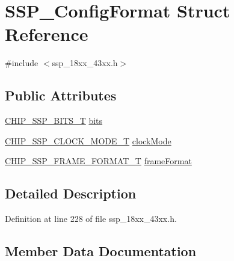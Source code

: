 \hypertarget{struct_s_s_p___config_format}{}\section{S\+S\+P\+\_\+\+Config\+Format Struct Reference}
\label{struct_s_s_p___config_format}


{\ttfamily \#include $<$ssp\+\_\+18xx\+\_\+43xx.\+h$>$}

\subsection*{Public Attributes}
\begin{DoxyCompactItemize}
\item 
\hyperlink{group___s_s_p__18_x_x__43_x_x_ga4e348748c4fb42ef94c2cbd968a43648}{C\+H\+I\+P\+\_\+\+S\+S\+P\+\_\+\+B\+I\+T\+S\+\_\+T} \hyperlink{struct_s_s_p___config_format_afaeb54b5e0525adda38644d3ef84dca1}{bits}
\item 
\hyperlink{group___s_s_p__18_x_x__43_x_x_ga12dec81e345a9ffbefd6a1fae5759e09}{C\+H\+I\+P\+\_\+\+S\+S\+P\+\_\+\+C\+L\+O\+C\+K\+\_\+\+M\+O\+D\+E\+\_\+T} \hyperlink{struct_s_s_p___config_format_a910e709c7d9e6e367a26028a939b69cf}{clock\+Mode}
\item 
\hyperlink{group___s_s_p__18_x_x__43_x_x_ga207687847d9ab8385057ddeca53c2942}{C\+H\+I\+P\+\_\+\+S\+S\+P\+\_\+\+F\+R\+A\+M\+E\+\_\+\+F\+O\+R\+M\+A\+T\+\_\+T} \hyperlink{struct_s_s_p___config_format_ae702ac713d3aa81bffdf140ad8942ec7}{frame\+Format}
\end{DoxyCompactItemize}


\subsection{Detailed Description}


Definition at line 228 of file ssp\+\_\+18xx\+\_\+43xx.\+h.



\subsection{Member Data Documentation}
\mbox{\label{struct_s_s_p___config_format_afaeb54b5e0525adda38644d3ef84dca1}} 
